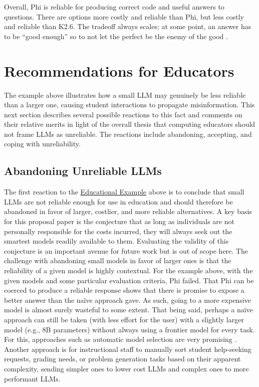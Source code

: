 Overall, Phi is reliable for producing correct code and useful answers to questions. There are options more costly and reliable than Phi, but less costly and reliable than K2.6. The tradeoff always scales; at some point, an answer has to be ``good enough'' so to not let the perfect be the enemy of the good \cite{dingHybridLlmCostefficient2024}.

\section{Recommendations for Educators}\label{recommendations-for-educators}

The example above illustrates how a small LLM may genuinely be less reliable than a larger one, causing student interactions to propagate misinformation. This next section describes several possible reactions to this fact and comments on their relative merits in light of the overall thesis that computing educators should not frame LLMs as unreliable. The reactions include abandoning, accepting, and coping with unreliability.

\subsection{Abandoning Unreliable LLMs}\label{abandoning-unreliable-llms}

The first reaction to the \hyperref[educational-example]{Educational Example} above is to conclude that small LLMs are not reliable enough for use in education and should therefore be abandoned in favor of larger, costlier, and more reliable alternatives. A key basis for this proposal paper is the conjecture that as long as individuals are not personally responsible for the costs incurred, they will always seek out the smartest models readily available to them. Evaluating the validity of this conjecture is an important avenue for future work but is out of scope here. The challenge with abandoning small models in favor of larger ones is that the reliability of a given model is highly contextual. For the example above, with the given models and some particular evaluation criteria, Phi failed. That Phi can be coerced to produce a reliable response shows that there is promise to expose a better answer than the naïve approach gave. As such, going to a more expensive model is almost surely wasteful to some extent. That being said, perhaps a naïve approach can still be taken (with less effort for the user) with a slightly larger model (e.g., 8B parameters) without always using a frontier model for every task. For this, approaches such as automatic model selection are very promising \cite{dingHybridLlmCostefficient2024,CopilotAutoModel,moslemDynamicModelRouting2026}. Another approach is for instructional staff to manually sort student help-seeking requests, grading needs, or problem generation tasks based on their apparent complexity, sending simpler ones to lower cost LLMs and complex ones to more performant LLMs.

